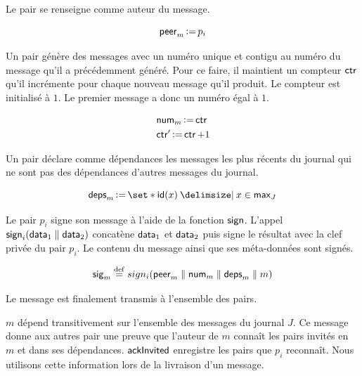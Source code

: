 Le pair se renseigne comme auteur du message.

\begin{equation*}
    \operatorname{\mathsf{peer}}_m \operatorname{\vcentcolon=} p_i
\end{equation*}

Un pair génère des messages avec un numéro unique et contigu au numéro du message qu'il a précédemment généré.
Pour ce faire, il maintient un compteur $\operatorname{\mathsf{ctr}}$ qu'il incrémente pour chaque nouveau message qu'il produit.
Le compteur est initialisé à $1$.
Le premier message a donc un numéro égal à $1$.

\begin{align*}
    &\operatorname{\mathsf{num}}_m \operatorname{\vcentcolon=} \operatorname{\mathsf{ctr}}\\
    &\operatorname{\mathsf{ctr}}' \operatorname{\vcentcolon=} \operatorname{\mathsf{ctr}} + 1
\end{align*}

Un pair déclare comme dépendances les messages les plus récents du journal qui ne sont pas des dépendances d'autres messages du journal.

\begin{equation*}
    \trm{deps}_m \assign \set*{\trm{id}(x) \given x \in \trm{max}_J}
\end{equation*}

Le pair $p_i$ signe son message à l'aide de la fonction $\operatorname{\mathsf{sign}}$.
L'appel $\operatorname{\mathsf{sign}}_i(\operatorname{\mathsf{data}}_1 \parallel \operatorname{\mathsf{data}}_2)$ concatène $\operatorname{\mathsf{data}}_1$ et $\operatorname{\mathsf{data}}_2$ puis signe le résultat avec la clef privée du pair $p_i$.
Le contenu du message ainsi que ses méta-données sont signés.


\begin{equation*}
    \operatorname{\mathsf{sig}}_m \overset{\mathrm{def}}{=} sign_i(\operatorname{\mathsf{peer}}_m \parallel \operatorname{\mathsf{num}}_m \parallel \operatorname{\mathsf{deps}}_m \parallel m)
\end{equation*}

Le message est finalement transmis à l'ensemble des pairs.

$m$ dépend transitivement sur l'ensemble des messages du journal $J$.
Ce message donne aux autres pair une preuve que l'auteur de $m$ connaît les pairs invités en $m$ et dans ses dépendances.
$\operatorname{\mathsf{ackInvited}}$ enregistre les pairs que $p_i$ reconnaît.
Nous utilisons cette information lors de la livraison d'un message.


